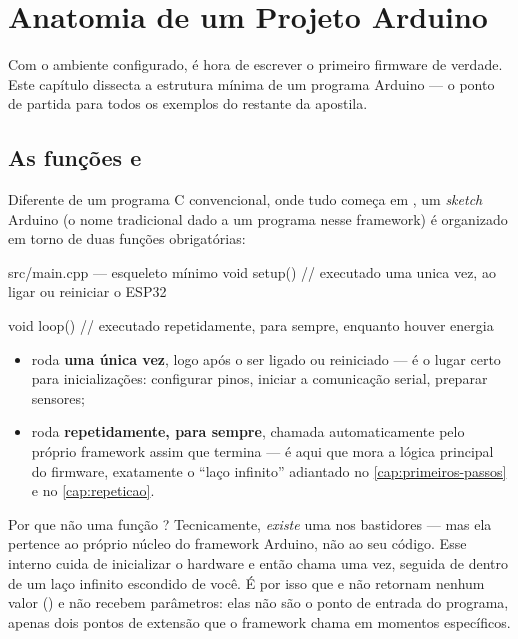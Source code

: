 \chapter{Anatomia de um Projeto Arduino}
\label{cap:anatomia}

Com o ambiente configurado, é hora de escrever o primeiro firmware de verdade. Este capítulo dissecta a estrutura mínima de um programa Arduino — o ponto de partida para todos os exemplos do restante da apostila.

\section{As funções  e }

Diferente de um programa C convencional, onde tudo começa em , um \emph{sketch} Arduino (o nome tradicional dado a um programa nesse framework) é organizado em torno de duas funções obrigatórias:

\begin{codigoc}{src/main.cpp — esqueleto mínimo}
void setup() {
    // executado uma unica vez, ao ligar ou reiniciar o ESP32
}

void loop() {
    // executado repetidamente, para sempre, enquanto houver energia
}
\end{codigoc}

\begin{itemize}
    \item {} roda \textbf{uma única vez}, logo após o \ESP{} ser ligado ou reiniciado — é o lugar certo para inicializações: configurar pinos, iniciar a comunicação serial, preparar sensores;
    \item {} roda \textbf{repetidamente, para sempre}, chamada automaticamente pelo próprio framework assim que  termina — é aqui que mora a lógica principal do firmware, exatamente o ``laço infinito'' adiantado no \cref{cap:primeiros-passos} e no \cref{cap:repeticao}.
\end{itemize}

\begin{nota}
Por que não uma função ? Tecnicamente, \emph{existe} uma  nos bastidores — mas ela pertence ao próprio núcleo do framework Arduino, não ao seu código. Esse  interno cuida de inicializar o hardware e então chama  uma vez, seguida de  dentro de um laço infinito escondido de você. É por isso que  e  não retornam nenhum valor () e não recebem parâmetros: elas não são o ponto de entrada do programa, apenas dois pontos de extensão que o framework chama em momentos específicos.
\end{nota}

